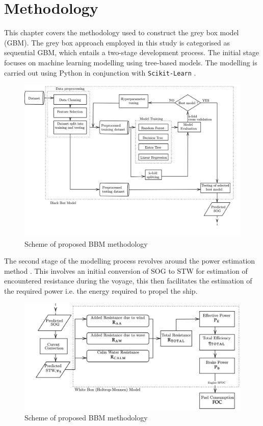 \documentclass[]{interact}
\theoremstyle{plain}%
\theoremstyle{definition}
\theoremstyle{remark}
\begin{document}
\section{Methodology}\label{sec:big_methodology}

This chapter covers the methodology used to construct the grey box model (GBM). The grey box approach employed in this study is categorised as sequential GBM, which entails a two-stage development process. The initial stage focuses on machine learning modelling using tree-based models. The modelling is carried out using Python in conjunction with \texttt{Scikit-Learn} \citep{FabianPedregosa.2011}. 
\begin{figure}
  \centering
      \includegraphics[width=.75\textwidth]{00_figures/flowmethod_BBM_alt.png}
      \caption{Scheme of proposed BBM methodology}
      \label{fig:flowchart_BBM}
\end{figure}

The second stage of the modelling process revolves around the power estimation method \citep{Holtrop.1984}. This involves an initial conversion of SOG to STW for estimation of encountered resistance during the voyage, this then facilitates the estimation of the required power i.e. the energy required to propel the ship.

\begin{figure}
  \centering
      \includegraphics[width=.75\textwidth]{00_figures/flowmethod_WBM.png}
      \caption{Scheme of proposed BBM methodology}
      \label{fig:flowchart_GBM}
\end{figure}
\end{document}
